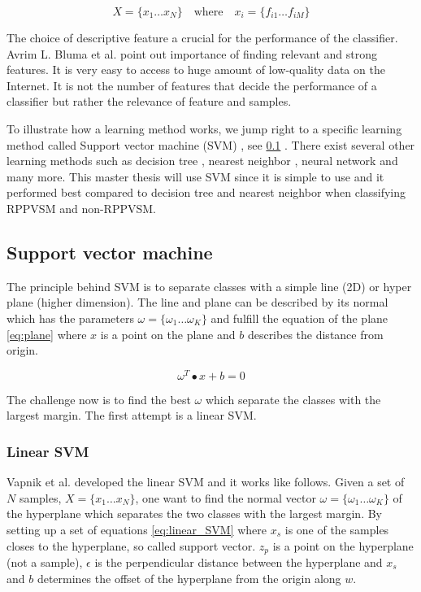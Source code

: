 \begin{equation} \label{eq:supervised}
X = \{x_1 \dots x_N \} \quad \text{where} \quad x_i = \{f_{i1} \dots f_{iM} \}
\end{equation}

The choice of descriptive feature a crucial for the performance of the classifier. Avrim L. Bluma et al. \cite{blum1997selection} point out importance of finding relevant and strong features. It is very easy to access to huge amount of low-quality data on the Internet. It is not the number of features that decide the performance of a classifier but rather the relevance of feature and samples. 

To illustrate how a learning method works, we jump right to a specific learning method called Support vector machine (SVM) \cite{cortes1995support}, see \cref{section:SVM} . There exist several other learning methods such as decision tree \cite{loh2011classification}, nearest neighbor \cite{keller1985fuzzy}, neural network \cite{kohonen1988introduction} and many more. This master thesis will use SVM since it is simple to use and it performed best \cite{torso_RPPVSM} compared to decision tree and nearest neighbor when classifying RPPVSM and non-RPPVSM.  


\subsection{Support vector machine} \label{section:SVM}

The principle behind SVM is to separate classes with a simple line (2D) or hyper plane (higher dimension). The line and plane can be described by its normal which has the parameters $\omega = \{\omega_1 \dots \omega_K\}$ and fulfill the equation of the plane \cref{eq:plane} where $x$ is a point on the plane and $b$ describes the distance from origin. 

\begin{equation} \label{eq:plane}
\omega^T \bullet x + b = 0 
\end{equation}

The challenge now is to find the best $\omega$ which separate the classes with the largest margin. The first attempt is a linear SVM.

\subsubsection{Linear SVM}

Vapnik et al.\cite{vapnik1963pattern} developed the linear SVM and it works like follows. Given a set of $N$ samples, $X = \{x_1 \dots x_N\}$, one want to find the normal vector $\omega = \{\omega_1 \dots \omega_K\}$ of the hyperplane which separates the two classes with the largest margin. By setting up a set of equations \cref{eq:linear_SVM} where $x_s$ is one of the samples closes to the hyperplane, so called support vector. $z_p$ is a point on the hyperplane (not a sample), $\epsilon$ is the perpendicular distance between the hyperplane and $x_s$ and $b$ determines the offset of the hyperplane from the origin along $w$. 

